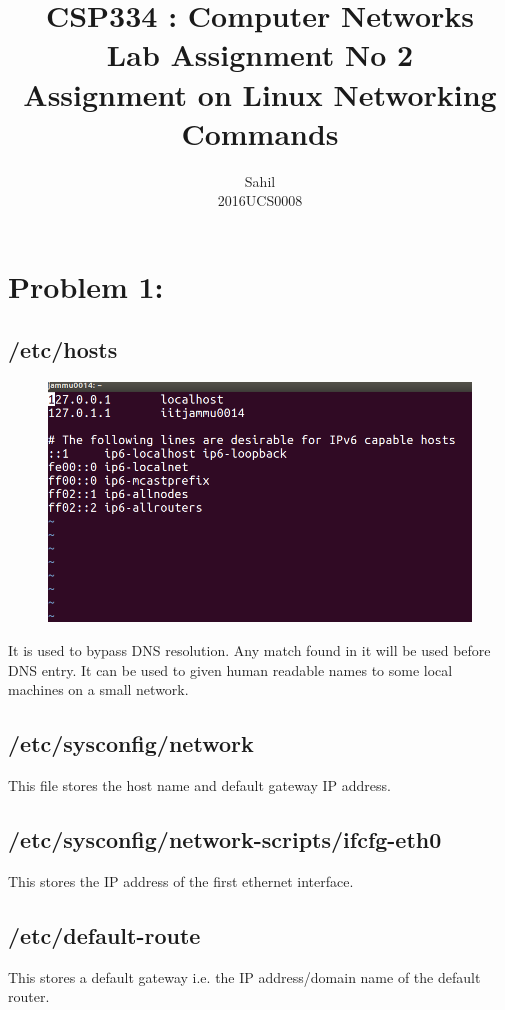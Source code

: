 \documentclass[]{report}
\title{\centering CSP334 : Computer Networks \\Lab Assignment No 2\\Assignment on Linux Networking Commands}
\author{\LARGE Sahil\\2016UCS0008}
\begin{document}
\maketitle

\section{Problem 1:}

\subsection{/etc/hosts} 
\begin{figure}[H]
	\vspace{0pt}
	\includegraphics[width=\linewidth, keepaspectratio]{Snapshots/exe1/hosts.png}
\end{figure}
It is used to bypass DNS resolution. Any match found in it will be used before DNS entry. It can be used to given human readable names to some local machines on a small network.
 
\subsection{/etc/sysconfig/network}
This file stores the host name and default gateway IP address.

\subsection{/etc/sysconfig/network-scripts/ifcfg-eth0}
This stores the IP address of the first ethernet interface.

\subsection{/etc/default-route}
This stores a default gateway i.e. the IP address/domain name of the default router.
\end{document}
